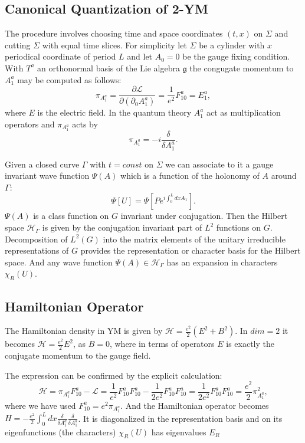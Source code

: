 \documentclass[11pt]{report}
\theoremstyle{plain}
\theoremstyle{definition}
\theoremstyle{remark}
\theoremstyle{remark}
\numberwithin{equation}{section}
\begin{document}
\subsection{Canonical Quantization of 2-YM}  
The procedure involves choosing time and space coordinates $(t,x)$ on $\Sigma$ and cutting $\Sigma$ with equal time slices. For simplicity let $\Sigma$ be a cylinder with $x$ periodical coordinate of period $L$ and let $A_0 = 0$ be the gauge fixing condition. With $T^a$ an orthonormal basis of the Lie algebra $\mathfrak{g}$ the congugate momentum to $A^a_1$ may be computed as follows:
$$ \pi_{A^a_1} = \frac{\partial \mathcal{L}}{\partial (\partial_0 A^a_1)} = \frac{1}{e^2}F^a_{10} = E^a_1, $$
where $E$ is the electric field. In the quantum theory $A^a_1$ act as multiplication operators and $\pi_{A^a_1}$ acts by 
$$\pi_{A^a_1} = -i\frac{\delta}{\delta A^a_1}.$$

Given a closed curve $\Gamma$ with $t=const$ on $\Sigma$ we can associate to it a gauge invariant wave function $\Psi (A)$ which is a function of the holonomy of $A$ around $\Gamma$:
$$ \Psi[U] = \Psi [P e^{i\int_0^L dx A_1} ].$$
$\Psi (A)$ is a class function on $G$ invariant under conjugation.
Then the Hilbert space $\mathcal{H}_{\Gamma}$ is given by the conjugation invariant part of $L^2$ functions on $G$. Decomposition of $L^2(G)$ into the matrix elements of the unitary irreducible representations of $G$ provides the representation or character basis for the Hilbert space. And any wave function $\Psi (A) \in \mathcal{H}_{\Gamma}$ has an expansion in characters $\chi_R(U)$.

\subsection{Hamiltonian Operator}

The Hamiltonian density in YM is given by $\mathcal{H}=\frac{e^2}{2}(E^2 + B^2)$. In $dim=2$ it becomes $\mathcal{H}=\frac{e^2}{2} E^2$, as $B=0$, where in terms of operators $E$ is exactly the conjugate momentum to the gauge field. 

The expression can be confirmed by the explicit calculation:
%
$$
\mathcal{H} = \pi_{A^a_1} F^a_{10} - \mathcal{L} = \frac{1}{e^2}F^a_{10}F^a_{10} - \frac{1}{2e^2}F^a_{10}F^a_{10} = \frac{1}{2e^2}F^a_{10}F^a_{10} = \frac{e^2}{2}\pi_{A^a_1}^2,
$$
where we have used $F^a_{10} = e^2\pi_{A^a_1}$.
And the Hamiltonian operator becomes $H = -\frac{e^2}{2} \int^L_0 dx \frac{\delta}{\delta A^a_1}\frac{\delta}{\delta A^a_1}$. It is diagonalized in the representation basis and on its eigenfunctions (the characters) $\chi_R(U)$ has eigenvalues $E_R$
\end{document}

